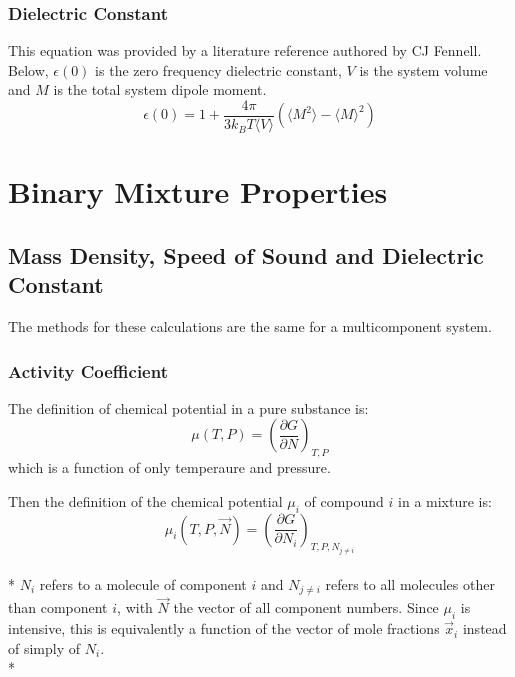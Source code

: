 \documentclass[a4paper,12pt]{article}
\begin{document}
\subsubsection{Dielectric Constant}
 This equation was provided by a literature reference authored by CJ Fennell\cite{dielec}. Below, $\epsilon(0)$ is the zero frequency dielectric constant, $V$ is the system volume and $M$ is the total system dipole moment. 
\begin{equation} \epsilon(0) = 1 + \frac{4 \pi}{3 k_B T \langle V \rangle}(\langle M^2 \rangle - \langle M \rangle^2) \end{equation}



\section{Binary Mixture Properties} 
\subsection{Mass Density, Speed of Sound and Dielectric Constant}
 The methods for these calculations are the same for a multicomponent system.

\subsubsection{Activity Coefficient}
The definition of chemical potential in a pure substance is:
\begin{equation}\mu(T,P) = \left(\frac{\partial G}{\partial N}\right)_{T,P}\end{equation}
which is a function of only temperaure and pressure.

Then the definition of the chemical potential $\mu_i$ of compound $i$ in a mixture is:
\begin{equation}\mu_{i}(T,P,\vec{N}) = \left(\frac{\partial G}{\partial N_{i}}\right)_{T,P,N_{j \neq i}}\end{equation}\\*
$N_i$ refers to a molecule of component $i$ and $N_{j \neq i}$ refers
to all molecules other than component $i$, with $\vec{N}$ the vector
of all component numbers. Since $\mu_i$ is intensive, this is
equivalently a function of the vector of mole fractions $\vec{x}_i$ instead of simply of $N_i$.\\*
\end{document}
